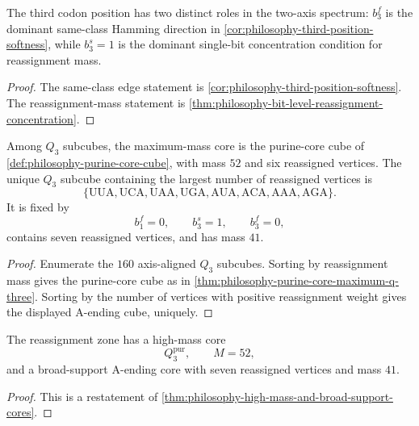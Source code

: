 \begin{corollary}
\label{cor:philosophy-third-position-dual-role}
The third codon position has two distinct roles in the two-axis
spectrum: $b_{3}^{f}$ is the dominant same-class Hamming direction in
\autoref{cor:philosophy-third-position-softness}, while $b_{3}^{s}=1$
is the dominant single-bit concentration condition for reassignment
mass.
\end{corollary}
\begin{proof}
The same-class edge statement is
\autoref{cor:philosophy-third-position-softness}. The reassignment-mass
statement is
\autoref{thm:philosophy-bit-level-reassignment-concentration}.
\end{proof}

\begin{theorem}
\label{thm:philosophy-high-mass-and-broad-support-cores}
Among $Q_{3}$ subcubes, the maximum-mass core is the purine-core cube
of \autoref{def:philosophy-purine-core-cube}, with mass $52$ and six
reassigned vertices. The unique $Q_{3}$ subcube containing the largest
number of reassigned vertices is
$$
  \{\mathrm{UUA},\mathrm{UCA},\mathrm{UAA},\mathrm{UGA},
    \mathrm{AUA},\mathrm{ACA},\mathrm{AAA},\mathrm{AGA}\}.
$$
It is fixed by
$$
  b_{1}^{f}=0,\qquad b_{3}^{s}=1,\qquad b_{3}^{f}=0,
$$
contains seven reassigned vertices, and has mass $41$.
\end{theorem}
\begin{proof}
Enumerate the $160$ axis-aligned $Q_{3}$ subcubes. Sorting by
reassignment mass gives the purine-core cube as in
\autoref{thm:philosophy-purine-core-maximum-q-three}. Sorting by the
number of vertices with positive reassignment weight gives the displayed
A-ending cube, uniquely.
\end{proof}

\begin{corollary}
\label{cor:philosophy-two-cores-reassignment-zone}
The reassignment zone has a high-mass core
$$
  Q_{3}^{\mathrm{pur}},\qquad M=52,
$$
and a broad-support A-ending core with seven reassigned vertices and
mass $41$.
\end{corollary}
\begin{proof}
This is a restatement of
\autoref{thm:philosophy-high-mass-and-broad-support-cores}.
\end{proof}

